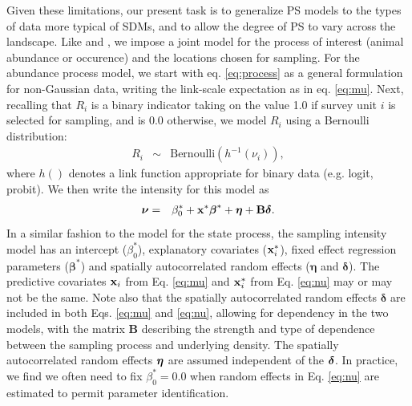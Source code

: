\documentclass[times,mee,doublespace,]{besauth2}
\begin{document}
Given these limitations, our present task is to generalize PS models to the types of data more typical of SDMs, and to allow the degree of PS to vary across the landscape.  Like \citet{DiggleEtAl2010} and \citet{PatiEtAl2011}, we impose a joint model for the process of interest (animal abundance or occurence) and the locations chosen for sampling. For the abundance process model, we start with eq. \ref{eq:process} as a general formulation for non-Gaussian data, writing the link-scale expectation as in eq. \ref{eq:mu}.
Next, recalling that $R_i$ is a binary indicator taking on the value 1.0 if survey unit $i$ is selected for sampling, and is 0.0 otherwise, we model $R_i$ using a Bernoulli distribution:
\begin{eqnarray}
 \label{eq:R}
  R_i & \sim & \text{Bernoulli}(h^{-1}(\nu_i)),
\end{eqnarray}
where $h()$ denotes a link function appropriate for binary data (e.g. logit, probit).  We then write the intensity for this model as
\begin{eqnarray}
  \label{eq:nu}
  \boldsymbol{\nu} & = & \beta_0^* + {\bf x}^* \boldsymbol{\beta}^*+\boldsymbol{\eta}+{\bf B} \boldsymbol{\delta}.
\label{eq:nu}
\end{eqnarray}
 In a similar fashion to the model for the state process, the sampling intensity model has an intercept ($\beta_0^*$), explanatory covariates (${\bf x}_i^*$), fixed effect regression parameters ($\boldsymbol{\beta}^*$) and spatially autocorrelated random effects ($\boldsymbol{\eta}$ and $\boldsymbol{\delta}$).  The predictive covariates ${\bf x}_i$ from Eq. \ref{eq:mu} and ${\bf x}_i^*$ from Eq. \ref{eq:nu} may or may not be the same.  Note also that the  spatially autocorrelated random effects $\boldsymbol{\delta}$ are included in both Eqs. \ref{eq:mu} and \ref{eq:nu}, allowing for dependency in the two models, with the matrix {\bf B} describing the strength and type of dependence between the sampling process and underlying density.  The spatially autocorrelated random effects $\boldsymbol{\eta}$ are assumed independent of the $\boldsymbol{\delta}$.  In practice, we find we often need to fix $\beta_0^*=0.0$ when random effects in Eq. \ref{eq:nu} are estimated to permit parameter identification.
\end{document}
